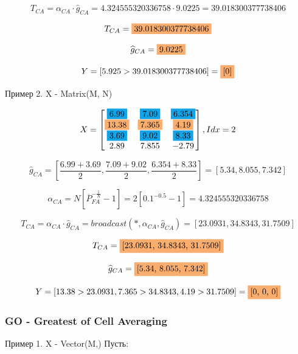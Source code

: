 \documentclass[a4paper,11pt]{article}
\begin{document}
			$$ T_{CA} = \alpha_{CA}\cdot \widehat{g}_{CA} = 4.324555320336758 \cdot 9.0225 = 39.018300377738406$$
			
			\begin{framed}
				
			$$ T_{CA} = \colorbox{Apricot}{39.018300377738406}$$
			
			$$ \widehat{g}_{CA} = \colorbox{Apricot}{9.0225}$$ 
			
			$$ Y = [5.925 > 39.018300377738406] = \colorbox{Apricot}{[0]}$$
			\end{framed}
			
			Пример 2. X - Matrix(M, N)
			
			$$X = 
			\begin{bmatrix}
				\colorbox{Cerulean}{6.99} & \colorbox{Cerulean}{7.09} & \colorbox{Cerulean}{6.354}\\
				\colorbox{Apricot}{13.38} & \colorbox{Apricot}{7.365} & \colorbox{Apricot}{4.19}\\
				\colorbox{Cerulean}{3.69} & \colorbox{Cerulean}{9.02} &	 \colorbox{Cerulean}{8.33}\\
				2.89 & 7.855 & -2.79
			\end{bmatrix}, Idx = 2
			$$
			
			$$ \widehat{g}_{CA} = \left[\frac{6.99 + 3.69}{2}, \frac{7.09 + 9.02}{2}, \frac{6.354 + 8.33}{2}\right] = [5.34,  8.055,  7.342]$$
			
			$$ \alpha_{CA} = N \left[\overline{P}_{FA}^{-\frac{1}{N}} - 1\right] = 2 \left[0.1^{-0.5} - 1\right] = 4.324555320336758$$
			
			$$ T_{CA} = \alpha_{CA}\cdot \widehat{g}_{CA} = broadcast(*, \alpha_{CA}, \widehat{g}_{CA})= [23.0931,  34.8343,  31.7509] $$
			
			\begin{framed}
				
				$$ T_{CA} =  \colorbox{Apricot}{[23.0931,  34.8343,  31.7509]}$$
				
				$$ \widehat{g}_{CA} =  \colorbox{Apricot}{[5.34,  8.055,  7.342]}$$ 
				
				$$ Y = [13.38 > 23.0931, 7.365 > 34.8343, 4.19 > 31.7509] = \colorbox{Apricot}{[0, 0, 0]}$$
			\end{framed}
		
		\subsubsection{GO - Greatest of Cell Averaging}
			Пример 1. X - Vector(M,)
			Пусть:
			
\end{document}
